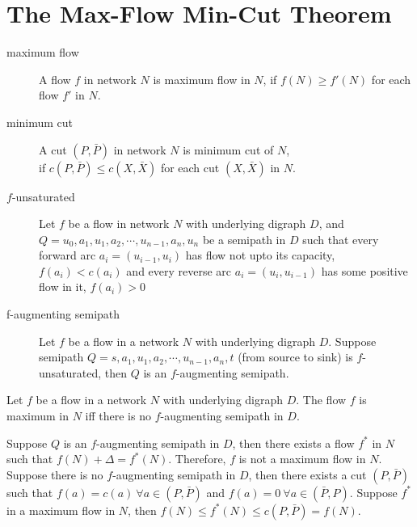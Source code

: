 \section{The Max-Flow Min-Cut Theorem}
\begin{definition}
	\begin{description}
		\item[maximum flow] A flow $f$ in network $N$ is maximum flow in $N$, if $f(N) \ge f'(N)$ for each flow $f'$ in $N$.
		\item[minimum cut] A cut $(P,\bar{P})$ in network $N$ is minimum cut of $N$,\\ if $c(P,\bar{P}) \le c(X,\bar{X})$ for each cut $(X,\bar{X})$ in $N$.
		\item[$f$-unsaturated] Let $f$ be a flow in network $N$ with underlying digraph $D$, and $Q = u_0,a_1,u_1,a_2,\cdots,u_{n-1},a_n,u_n$ be a semipath in $D$ such that every forward arc $a_i = (u_{i-1},u_i)$ has flow not upto its capacity, $f(a_i) < c(a_i)$ and every reverse arc $a_i = (u_i,u_{i-1})$ has some positive flow in it, $f(a_i) > 0$
		\item[f-augmenting semipath] Let $f$ be a flow in a network $N$ with underlying digraph $D$. Suppose semipath $Q = s,a_1,u_1,a_2,\cdots,u_{n-1},a_n,t$ (from source to sink) is $f$-unsaturated, then $Q$ is an $f$-augmenting semipath.
	\end{description}
\end{definition}
\begin{theorem}
	Let $f$ be a flow in a network $N$ with underlying digraph $D$. The flow $f$ is maximum in $N$ iff there is no $f$-augmenting semipath in $D$.
\end{theorem}
\begin{synopsis}
	Suppose $Q$ is an $f$-augmenting semipath in $D$, then there exists a flow $f^*$ in $N$ such that $f(N)+\Delta = f^*(N)$. Therefore, $f$ is not a maximum flow in $N$. Suppose there is no $f$-augmenting semipath in $D$, then there exists a cut $(P,\bar{P})$ such that $f(a) = c(a)\ \forall a \in (P,\bar{P})$ and $f(a) = 0\ \forall a \in (\bar{P},P)$. Suppose $f^*$ in a maximum flow in $N$, then $f(N) \le f^*(N) \le c(P,\bar{P}) = f(N)$.
\end{synopsis}
